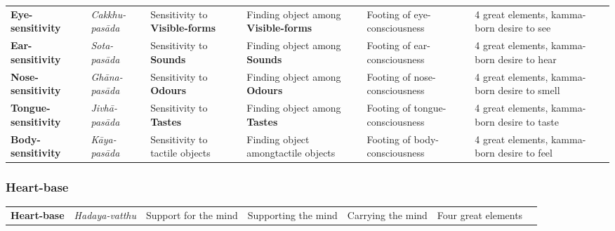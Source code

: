 \documentclass[a4 paper, 12pt]{article}
\begin{document}
\begin{tabular}{P{0.21\textwidth} | C{.13\textwidth} C{.165\textwidth} C{0.165\textwidth} C{0.165\textwidth} C{0.165\textwidth} m{0mm}}
\toprule
 &  &  &  &  & \\
\midrule
\textbf{Eye-sensitivity} & \textit{Cakkhu-pasāda} & Sensitivity to \textbf{Visible-forms} & Finding object among \textbf{Visible-forms} & Footing of eye-consciousness & 4 great elements, kamma-born desire to see &\\[9mm]
\textbf{Ear-sensitivity} & \textit{Sota-\newline pasāda} & Sensitivity to \textbf{Sounds} & Finding object among \textbf{Sounds} & Footing of ear-consciousness & 4 great elements, kamma-born desire to hear &\\[9mm]
\textbf{Nose-sensitivity} & \textit{Ghāna-pasāda} & Sensitivity to \textbf{Odours} & Finding object among \textbf{Odours} & Footing of nose-consciousness & 4 great elements, kamma-born desire to smell &\\[9mm]
\textbf{Tongue-sensitivity} & \textit{Jivhā-\newline pasāda} & Sensitivity to \textbf{Tastes} & Finding object among \textbf{Tastes} & Footing of tongue-consciousness & 4 great elements, kamma-born desire to taste &\\[9mm]
\textbf{Body-sensitivity} & \textit{Kāya-\newline pasāda} & Sensitivity to tactile objects & Finding object among\newline tactile objects & Footing of body-consciousness & 4 great elements, kamma-born desire to feel &\\[9mm]
\bottomrule
\end{tabular} 

\subsubsection*{\textbf{Heart-base}}

\setlength{\tabcolsep}{0pt}
\renewcommand{\arraystretch}{1.1}

\begin{tabular}{P{0.21\textwidth} | C{.13\textwidth} C{.165\textwidth} C{0.165\textwidth} C{0.165\textwidth} C{0.165\textwidth} m{0mm}}
\toprule
 &  &  &  &  & \\
\midrule
\textbf{Heart-base} & \textit{Hadaya-vatthu} & Support for the mind & Supporting the mind & Carrying the mind & Four great elements &\\[9mm]
\bottomrule
\end{tabular} 
\end{document}
